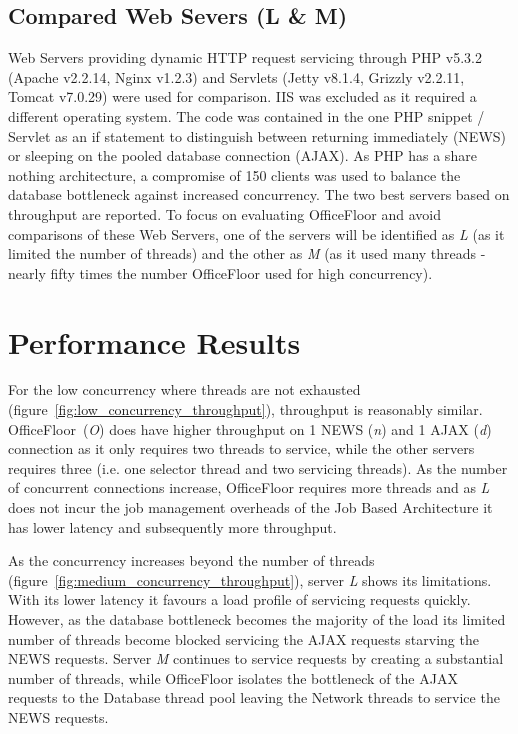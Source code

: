 \documentclass[conference]{ieee/IEEEtran}
\begin{document}
\subsection{Compared Web Severs (L \& M)}
Web Servers providing dynamic HTTP request servicing through PHP v5.3.2 (Apache
v2.2.14, Nginx v1.2.3) and Servlets (Jetty v8.1.4, Grizzly v2.2.11, Tomcat
v7.0.29) were used for comparison.  IIS was excluded as it required a different
operating system.  The code was contained in the one PHP snippet / Servlet as an
if statement to distinguish between returning immediately (NEWS) or sleeping on
the pooled database connection (AJAX).  As PHP has a share nothing architecture,
a compromise of 150 clients was used to balance the database bottleneck against
increased concurrency.  The two best servers based on throughput are reported.
To focus on evaluating OfficeFloor and avoid comparisons of these Web Servers,
one of the servers will be identified as \textit{L} (as it limited the number of
threads) and the other as \textit{M} (as it used many threads - nearly fifty
times the number OfficeFloor used for high concurrency).



\section{Performance Results}
For the low concurrency where threads are not exhausted
(figure~\ref{fig:low_concurrency_throughput}), throughput is reasonably similar.
OfficeFloor~(\textit{O}) does have higher throughput on 1 NEWS (\textit{n}) and
1 AJAX (\textit{d}) connection as it only requires two threads to service, while
the other servers requires three (i.e. one selector thread and two servicing
threads).  As the number of concurrent connections increase, OfficeFloor
requires more threads and as \textit{L} does not incur the job management
overheads of the Job Based Architecture it has lower latency and subsequently
more throughput.

As the concurrency increases beyond the number of threads
(figure~\ref{fig:medium_concurrency_throughput}), server \textit{L} shows its
limitations.  With its lower latency it favours a load profile of servicing
requests quickly.  However, as the database bottleneck becomes the majority of
the load its limited number of threads become blocked servicing the AJAX
requests starving the NEWS requests.  Server \textit{M} continues to service
requests by creating a substantial number of threads, while OfficeFloor isolates
the bottleneck of the AJAX requests to the Database thread pool leaving the
Network threads to service the NEWS requests.
\end{document}
